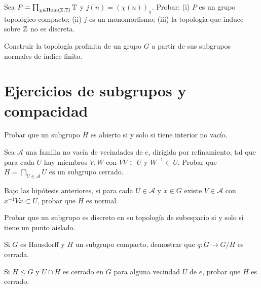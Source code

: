 \begin{ejercicio}\label{ej:v4-l15-3}
Sea $P=\prod_{\chi\in\operatorname{Hom}(\mathbb Z,\mathbb T)}\mathbb T$ y $j(n)=(\chi(n))_\chi$. Probar: (i) $P$ es un grupo topológico compacto; (ii) $j$ es un monomorfismo; (iii) la topología que induce sobre $\mathbb Z$ no es discreta.
\end{ejercicio}

\begin{ejercicio}\label{ej:v4-l15-4}
Construir la topología profinita de un grupo $G$ a partir de sus subgrupos normales de índice finito.
\end{ejercicio}


\section{Ejercicios de subgrupos y compacidad}
\begin{ejercicio}\label{ej:v4-l16-1}
Probar que un subgrupo $H$ es abierto si y solo si tiene interior no vacío.
\end{ejercicio}

\begin{ejercicio}\label{ej:v4-l16-2}
Sea $\mathcal A$ una familia no vacía de vecindades de $e$, dirigida por refinamiento, tal que para cada $U$ hay miembros $V,W$ con $VV\subset U$ y $W^{-1}\subset U$. Probar que $H=\bigcap_{U\in\mathcal A}U$ es un subgrupo cerrado.
\end{ejercicio}

\begin{ejercicio}\label{ej:v4-l16-3}
Bajo las hipótesis anteriores, si para cada $U\in\mathcal A$ y $x\in G$ existe $V\in\mathcal A$ con $x^{-1}Vx\subset U$, probar que $H$ es normal.
\end{ejercicio}

\begin{ejercicio}\label{ej:v4-l16-4}
Probar que un subgrupo es discreto en su topología de subespacio si y solo si tiene un punto aislado.
\end{ejercicio}

\begin{ejercicio}\label{ej:v4-l16-5}
Si $G$ es Hausdorff y $H$ un subgrupo compacto, demostrar que $q:G\to G/H$ es cerrada.
\end{ejercicio}

\begin{ejercicio}\label{ej:v4-l16-6}
Si $H\leq G$ y $U\cap H$ es cerrado en $G$ para alguna vecindad $U$ de $e$, probar que $H$ es cerrado.
\end{ejercicio}


